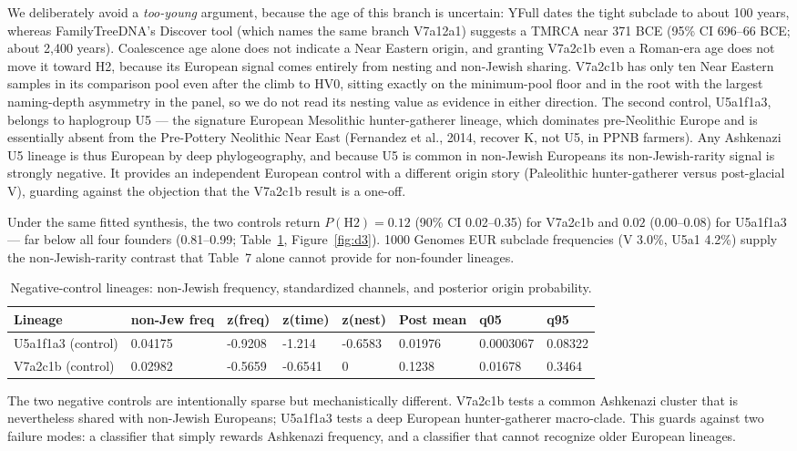 \documentclass[11pt]{article}
\begin{document}
We deliberately avoid a \emph{too-young} argument, because the age of this branch is uncertain: YFull dates the tight subclade to about 100 years, whereas FamilyTreeDNA's Discover tool (which names the same branch V7a12a1) suggests a TMRCA near 371 BCE (95\% CI 696--66 BCE; about 2,400 years). Coalescence age alone does not indicate a Near Eastern origin, and granting V7a2c1b even a Roman-era age does not move it toward H2, because its European signal comes entirely from nesting and non-Jewish sharing. V7a2c1b has only ten Near Eastern samples in its comparison pool even after the climb to HV0, sitting exactly on the minimum-pool floor and in the root with the largest naming-depth asymmetry in the panel, so we do not read its nesting value as evidence in either direction. The second control, U5a1f1a3, belongs to haplogroup U5 --- the signature European Mesolithic hunter-gatherer lineage, which dominates pre-Neolithic Europe and is essentially absent from the Pre-Pottery Neolithic Near East (Fernandez et al., 2014, recover K, not U5, in PPNB farmers). Any Ashkenazi U5 lineage is thus European by deep phylogeography, and because U5 is common in non-Jewish Europeans its non-Jewish-rarity signal is strongly negative. It provides an independent European control with a different origin story (Paleolithic hunter-gatherer versus post-glacial V), guarding against the objection that the V7a2c1b result is a one-off.

Under the same fitted synthesis, the two controls return $P(\text{H2}) = 0.12$ (90\% CI 0.02--0.35) for V7a2c1b and $0.02$ (0.00--0.08) for U5a1f1a3 --- far below all four founders (0.81--0.99; Table~\ref{tab:nc}, Figure~\ref{fig:d3}). 1000 Genomes EUR subclade frequencies (V 3.0\%, U5a1 4.2\%) supply the non-Jewish-rarity contrast that Table~7 alone cannot provide for non-founder lineages.

\begin{table}[htbp]
\centering
\footnotesize
\caption{Negative-control lineages: non-Jewish frequency, standardized channels, and posterior origin probability.}
\label{tab:nc}
\begin{tabular}{llllllll}
\toprule
Lineage & non-Jew freq & z(freq) & z(time) & z(nest) & Post mean & q05 & q95 \\
\midrule
U5a1f1a3 (control) & 0.04175 & -0.9208 & -1.214 & -0.6583 & 0.01976 & 0.0003067 & 0.08322 \\
V7a2c1b (control) & 0.02982 & -0.5659 & -0.6541 & 0 & 0.1238 & 0.01678 & 0.3464 \\
\bottomrule
\end{tabular}
\end{table}
The two negative controls are intentionally sparse but mechanistically different. V7a2c1b tests a common Ashkenazi cluster that is nevertheless shared with non-Jewish Europeans; U5a1f1a3 tests a deep European hunter-gatherer macro-clade. This guards against two failure modes: a classifier that simply rewards Ashkenazi frequency, and a classifier that cannot recognize older European lineages.
\end{document}
